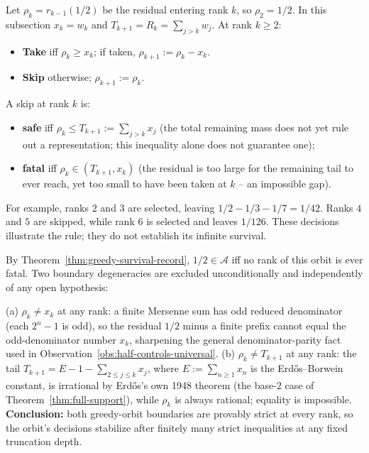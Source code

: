 \begin{defn}
\label{defn:greedy-orbit}
Let $\rho_k=r_{k-1}(1/2)$ be the residual entering rank $k$, so
$\rho_2=1/2$.  In this subsection $x_k=w_k$ and
$T_{k+1}=R_k=\sum_{j>k}w_j$.  At rank $k\ge2$:
\begin{itemize}[nosep]
\item \textbf{Take} iff $\rho_k \ge x_k$; if taken, $\rho_{k+1} := \rho_k - x_k$.
\item \textbf{Skip} otherwise; $\rho_{k+1} := \rho_k$.
\end{itemize}
A skip at rank $k$ is:
\begin{itemize}[nosep]
\item \textbf{safe} iff $\rho_k \le T_{k+1} := \sum_{j>k} x_j$
(the total remaining mass does not yet rule out a representation; this
inequality alone does not guarantee one);
\item \textbf{fatal} iff $\rho_k \in (T_{k+1}, x_k)$ (the residual is too large for the remaining
tail to ever reach, yet too small to have been taken at $k$ -- an impossible gap).
\end{itemize}
\end{defn}

For example, ranks $2$ and $3$ are selected, leaving
$1/2-1/3-1/7=1/42$.  Ranks $4$ and $5$ are skipped, while rank $6$
is selected and leaves $1/126$.  These decisions illustrate the rule;
they do not establish its infinite survival.

By Theorem~\ref{thm:greedy-survival-record}, $1/2 \in \mathcal{A}$ iff no rank of this orbit is ever fatal.
Two boundary degeneracies are excluded unconditionally and independently of any open hypothesis:

\begin{rem}
\label{rem:no-ties}
(a) $\rho_k \ne x_k$ at any rank: a finite Mersenne sum has odd reduced denominator (each $2^n-1$ is
odd), so the residual $1/2$ minus a finite prefix cannot equal the odd-denominator
number $x_k$, sharpening the general
denominator-parity fact used in Observation~\ref{obs:half-controls-universal}.
(b) $\rho_k \ne T_{k+1}$ at any rank: the tail $T_{k+1} = E - 1 - \sum_{2 \le j \le k} x_j$, where
$E := \sum_{n\ge1} x_n$ is the Erd\H{o}s--Borwein constant, is irrational by Erd\H{o}s's own 1948
theorem (the base-$2$ case of Theorem~\ref{thm:full-support}), while $\rho_k$ is always rational;
equality is impossible. \textbf{Conclusion:} both greedy-orbit boundaries are provably strict at
every rank, so the orbit's decisions stabilize after finitely many strict inequalities at any fixed
truncation depth.
\end{rem}

